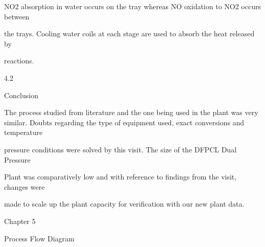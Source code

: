 \documentclass[a4paper,portrait,12pt]{article}
\begin{document}
\begin{flushleft}
NO2 absorption in water occurs on the tray whereas NO oxidation to NO2 occurs between
\end{flushleft}


\begin{flushleft}
the trays. Cooling water coils at each stage are used to absorb the heat released by
\end{flushleft}


\begin{flushleft}
reactions.
\end{flushleft}





4.2





\begin{flushleft}
Conclusion
\end{flushleft}





\begin{flushleft}
The process studied from literature and the one being used in the plant was very similar. Doubts regarding the type of equipment used, exact conversions and temperature
\end{flushleft}


\begin{flushleft}
pressure conditions were solved by this visit. The size of the DFPCL Dual Pressure
\end{flushleft}


\begin{flushleft}
Plant was comparatively low and with reference to findings from the visit, changes were
\end{flushleft}


\begin{flushleft}
made to scale up the plant capacity for verification with our new plant data.
\end{flushleft}





\begin{flushleft}
\newpage
Chapter 5
\end{flushleft}





\begin{flushleft}
Process Flow Diagram
\end{flushleft}
\end{document}
